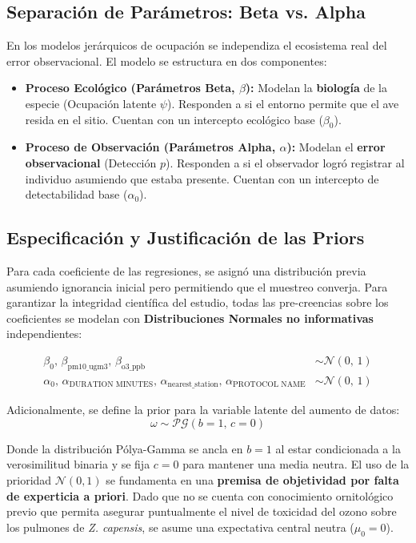 \documentclass[twocolumn,10pt]{article}
\begin{document}
\subsection{Separación de Parámetros: Beta vs. Alpha}

En los modelos jerárquicos de ocupación se independiza el ecosistema real del error observacional. El modelo se estructura en dos componentes:

\begin{itemize}
  \item \textbf{Proceso Ecológico (Parámetros Beta, $\beta$):} Modelan la \textbf{biología} de la especie (Ocupación latente $\psi$). Responden a si el entorno permite que el ave resida en el sitio. Cuentan con un intercepto ecológico base ($\beta_0$).
  \item \textbf{Proceso de Observación (Parámetros Alpha, $\alpha$):} Modelan el \textbf{error observacional} (Detección $p$). Responden a si el observador logró registrar al individuo asumiendo que estaba presente. Cuentan con un intercepto de detectabilidad base ($\alpha_0$).
\end{itemize}

\subsection{Especificación y Justificación de las Priors}

Para cada coeficiente de las regresiones, se asignó una distribución previa asumiendo ignorancia inicial pero permitiendo que el muestreo converja. Para garantizar la integridad científica del estudio, todas las pre-creencias sobre los coeficientes se modelan con \textbf{Distribuciones Normales no informativas} independientes:

\begin{align}
  \beta_0,\, \beta_{\text{pm10\_ugm3}},\, \beta_{\text{o3\_ppb}} &\sim \mathcal{N}(0,\, 1) \\
  \alpha_0,\, \alpha_{\text{DURATION MINUTES}},\, \alpha_{\text{nearest\_station}},\, \alpha_{\text{PROTOCOL NAME}} &\sim \mathcal{N}(0,\, 1)
\end{align}

Adicionalmente, se define la prior para la variable latente del aumento de datos:
\begin{equation}
    \omega \sim \mathcal{PG}(b=1,\, c=0)
\end{equation}

Donde la distribución Pólya-Gamma se ancla en $b=1$ al estar condicionada a la verosimilitud binaria y se fija $c=0$ para mantener una media neutra. El uso de la prioridad $\mathcal{N}(0, 1)$ se fundamenta en una \textbf{premisa de objetividad por falta de experticia a priori}. Dado que no se cuenta con conocimiento ornitológico previo que permita asegurar puntualmente el nivel de toxicidad del ozono sobre los pulmones de \textit{Z. capensis}, se asume una expectativa central neutra ($\mu_0 = 0$).
\end{document}
